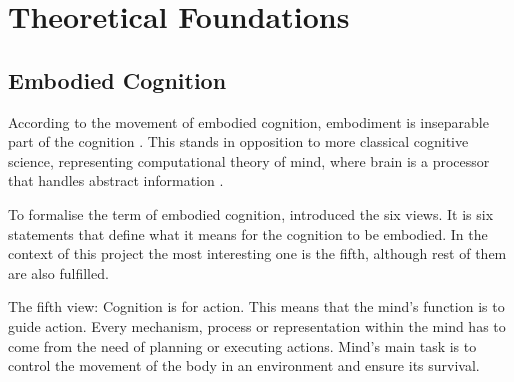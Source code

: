 
\section{Theoretical Foundations} \label{chapter:theory}


\subsection{Embodied Cognition} \label{chapter:theory:embodied}
According to the movement of embodied cognition, embodiment is inseparable part of the cognition \parencite{varela2017embodied}. This stands in opposition to more classical cognitive science, representing computational theory of mind, where brain is a processor that handles abstract information \parencite{pylyshyn1984computation}. 

To formalise the term of embodied cognition, \textcite{Wilson2002} introduced the six views. It is six statements that define what it means for the cognition to be embodied. In the context of this project the most interesting one is the fifth, although rest of them are also fulfilled. 


The fifth view: Cognition is for action. This means that the mind's function is to guide action. Every mechanism, process or representation within the mind has to come from the need of planning or executing actions. Mind's main task is to control the movement of the body in an environment and ensure its survival.

